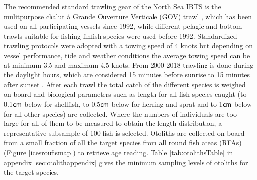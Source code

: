 \documentclass[a4paper 12pt]{article}
\numberwithin{equation}{section}
\newcommand{\cm}{\textnormal{\sffamily cm}\xspace}
\begin{document}
\indent The recommended standard trawling gear of the North Sea IBTS is the mulitpurpose chalut {\`a} Grande Ouverture Verticale (GOV) trawl \citep{ICES2012}, which has been used on all participating vessels since 1992, while different pelagic and bottom trawls suitable for fishing finfish species were used before 1992. Standardized trawling protocols were adopted with a towing speed of 4 knots but depending on vessel performance, tide and weather conditions the average towing speed can be at minimum 3.5 and maximum 4.5 knots. From 2000-2018 trawling is done during the daylight hours, which are considered 15 minutes before sunrise to 15 minutes  after sunset \citep{ICES2012}. After each trawl the total catch of the different species is weighed on board and biological parameters such as length for all fish species caught (to 0.1$\cm$ below for shellfish, to 0.5$\cm$ below for herring and sprat and to 1$\cm$ below for all other species) are collected. Where the numbers of individuals are too large for all of them  to be measured to obtain the length distribution, a representative subsample of 100 fish is selected. Otoliths are collected on board from a small fraction of all the target species from all  round fish areas (RFAs) (Figure \ref{icesroufismap}) to retrieve age reading. Table \ref{tab:otolithsTable} in appendix \ref{sec:otolithappendix} gives the minimum sampling levels of otoliths for the target species.
\end{document}
